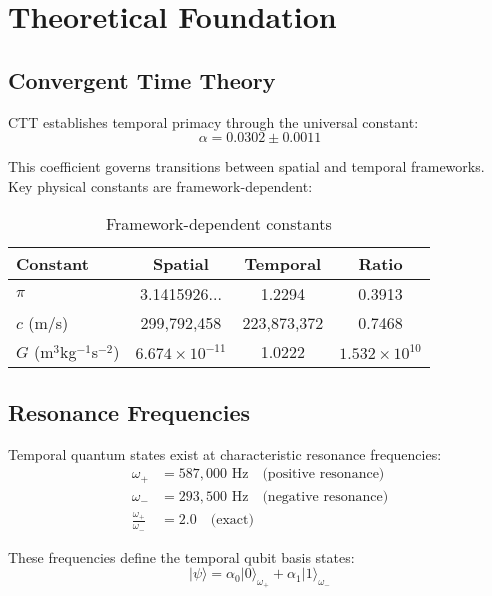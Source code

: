 \documentclass[12pt,a4paper]{article}
\begin{document}
\section{Theoretical Foundation}

\subsection{Convergent Time Theory}

CTT establishes temporal primacy through the universal constant:
\begin{equation}
\alpha = 0.0302 \pm 0.0011
\end{equation}

This coefficient governs transitions between spatial and temporal frameworks. Key physical constants are framework-dependent:

\begin{table}[h]
\centering
\begin{tabular}{|l|c|c|c|}
\hline
\textbf{Constant} & \textbf{Spatial} & \textbf{Temporal} & \textbf{Ratio} \\
\hline
$\pi$ & 3.1415926... & 1.2294 & 0.3913 \\
$c$ (m/s) & 299,792,458 & 223,873,372 & 0.7468 \\
$G$ (m$^3$kg$^{-1}$s$^{-2}$) & $6.674 \times 10^{-11}$ & 1.0222 & $1.532 \times 10^{10}$ \\
\hline
\end{tabular}
\caption{Framework-dependent constants}
\end{table}

\subsection{Resonance Frequencies}

Temporal quantum states exist at characteristic resonance frequencies:
\begin{align}
\omega_+ &= 587{,}000 \text{ Hz} \quad \text{(positive resonance)} \\
\omega_- &= 293{,}500 \text{ Hz} \quad \text{(negative resonance)} \\
\frac{\omega_+}{\omega_-} &= 2.0 \quad \text{(exact)}
\end{align}

These frequencies define the temporal qubit basis states:
\begin{equation}
|\psi\rangle = \alpha_0|0\rangle_{\omega_+} + \alpha_1|1\rangle_{\omega_-}
\end{equation}
\end{document}
